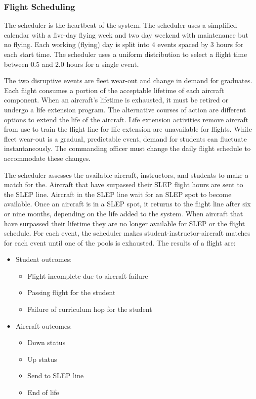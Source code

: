 \documentclass[preprint,12pt]{elsarticle}
\begin{document}
\subsubsection{Flight Scheduling}
The scheduler is the heartbeat of the system. The scheduler uses a
simplified calendar with a five-day flying week and two day weekend
with maintenance but no flying. Each working (flying) day is split into 4
events spaced by 3 hours for each start time. The scheduler uses a
uniform distribution to select a flight time between 0.5 and 2.0 hours
for a single event.

The two disruptive events
are fleet wear-out and change in demand for graduates. Each flight
consumes a portion of the acceptable lifetime of each aircraft
component. When an aircraft's lifetime is exhausted, it must be
retired or undergo a life extension program. The alternative courses
of action are different options to extend the life of the
aircraft. Life extension activities remove aircraft from use to train
the flight line for life extension are unavailable for flights. While
fleet wear-out is a gradual, predictable event, demand for students
can fluctuate instantaneously.  The commanding officer must change the
daily flight schedule to accommodate these changes.


The scheduler assesses the available aircraft, instructors,
and students to make a match for the. Aircraft that have surpassed their SLEP flight hours are
sent to the SLEP line.  Aircraft in the SLEP line wait for an
SLEP spot to become available. Once an aircraft is in a SLEP spot, it
returns to the flight line after six or nine months, depending on the life
added to the system.  When aircraft that have surpassed their lifetime
they are no longer available for SLEP
or the flight schedule. For each event, the scheduler makes
student-instructor-aircraft matches for each event until one of the
pools is exhausted. The results of a flight are:
\begin{itemize}
\item Student outcomes:
  \begin{itemize}
  \item Flight incomplete due to aircraft failure
  \item Passing flight  for the student
  \item Failure of curriculum hop for the student
  \end{itemize}
\item Aircraft outcomes:
  \begin{itemize}
  \item Down status
  \item Up status
  \item Send to SLEP line
  \item End of life
  \end{itemize}
\end{itemize}
\end{document}
